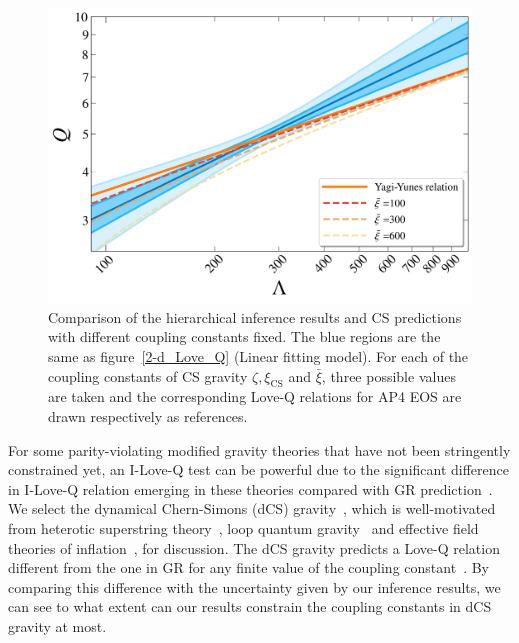 \documentclass[a4paper,11pt]{article}
\begin{document}
\begin{figure}[htbp]
    \begin{minipage}{0.48\linewidth}
        \includegraphics[width=\linewidth]{CS_xi_bar_AP4_2d.pdf}
    \end{minipage}
    \caption{Comparison of the hierarchical inference results and CS predictions with different coupling constants fixed. The blue regions are the same as figure~\ref{2-d_Love_Q} (Linear fitting model). For each of the coupling constants of CS gravity $\zeta, \xi_{\mathrm{CS}}$ and $\bar\xi$, three possible values are taken and the corresponding Love-Q relations for AP4 EOS are drawn respectively as references.}
    \label{cs_Love_Q}
\end{figure}

For some parity-violating modified gravity theories that have not been stringently constrained yet, an I-Love-Q test can be powerful due to the significant difference in I-Love-Q relation emerging in these theories compared with GR prediction~\cite{Yagi_2017, Yunes:2025xwp}. We select the dynamical Chern-Simons (dCS) gravity~\cite{Jackiw:2003pm, Smith:2007jm, Alexander:2009tp}, which is well-motivated from heterotic superstring theory~\cite{Polchinski:1998rq, Polchinski:1998rr}, loop quantum gravity~\cite{Alexander:2004xd, Taveras:2008yf, Calcagni:2009xz} and effective field theories of inflation~\cite{Weinberg:2008hq}, for discussion. The dCS gravity predicts a Love-Q relation different from the one in GR for any finite value of the coupling constant~\cite{Yagi:2013bca, Yagi:2013awa, Gupta:2017vsl}. By comparing this difference with the uncertainty given by our inference results, we can see to what extent can our results constrain the coupling constants in dCS gravity at most. 
\end{document}
